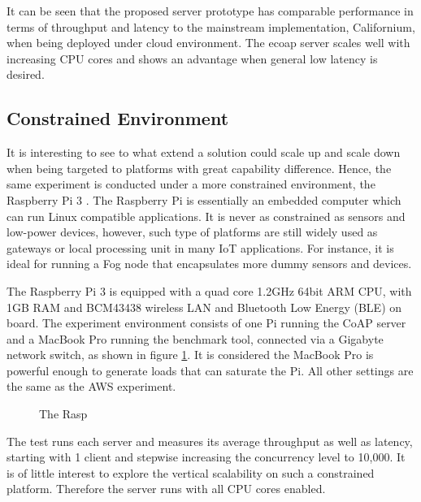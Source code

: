 It can be seen that the proposed server prototype has comparable performance in terms of throughput and latency to the mainstream implementation, Californium, when being deployed  under cloud environment. The ecoap server scales well with increasing CPU cores and shows an advantage when general low latency is desired.

\subsection{Constrained Environment}

It is interesting to see to what extend a solution could scale up and scale down when being targeted to platforms with great capability difference. Hence, the same experiment is conducted under a more constrained environment, the Raspberry Pi 3 \cite{raspberry_pi}. The Raspberry Pi is essentially an embedded computer which can run Linux compatible applications. It is never as constrained as sensors and low-power devices, however, such type of platforms are still widely used as gateways or local processing unit in many IoT applications. For instance, it is ideal for running a Fog node that encapsulates more dummy sensors and devices.

The Raspberry Pi 3 is equipped with a quad core 1.2GHz 64bit ARM CPU, with 1GB RAM and BCM43438 wireless LAN and Bluetooth Low Energy (BLE) on board. The experiment environment consists of one Pi running the CoAP server and a MacBook Pro running the benchmark tool, connected via a Gigabyte network switch, as shown in figure \ref{fig:rasp_experiment}. It is considered the MacBook Pro is powerful enough to generate loads that can saturate the Pi. All other settings are the same as the AWS experiment.

\begin{figure}[!htbp]
\centering
\caption{The Rasp}
\label{fig:rasp_experiment}
\end{figure}

The test runs each server and measures its average throughput as well as latency, starting with 1 client and stepwise increasing the concurrency level to 10,000. It is of little interest to explore the vertical scalability on such a constrained platform. Therefore the server runs with all CPU cores enabled.

